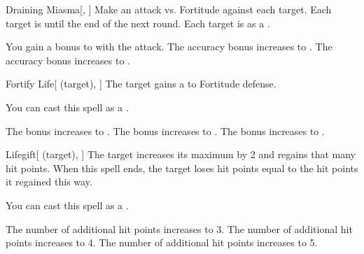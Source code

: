 \lowercase{\hypertarget{spell:Draining Miasma}{}}\label{spell:Draining Miasma}
\begin{freeability}[Rank 1]{\hypertarget{spell:Draining Miasma}{Draining Miasma}}[, ]
Make an attack vs. Fortitude against each target.
\hit Each target is  until the end of the next round.
\crit Each target is  as a .

\rankline
{} You gain a  bonus to  with the attack.
 The accuracy bonus increases to .
 The accuracy bonus increases to .
\end{freeability}
\vspace{0.25em}



\lowercase{\hypertarget{spell:Fortify Life}{}}\label{spell:Fortify Life}
\begin{attuneability}[Rank 1]{\hypertarget{spell:Fortify Life}{Fortify Life}}[ (target), ]
The target gains a   to Fortitude defense.

You can cast this spell as a .

\rankline
{} The bonus increases to .
 The bonus increases to .
 The bonus increases to .
\end{attuneability}
\vspace{0.25em}



\lowercase{\hypertarget{spell:Lifegift}{}}\label{spell:Lifegift}
\begin{attuneability}[Rank 1]{\hypertarget{spell:Lifegift}{Lifegift}}[ (target), ]
The target increases its maximum  by 2 and regains that many hit points.
When this spell ends, the target loses hit points equal to the hit points it regained this way.

You can cast this spell as a .

\rankline
{} The number of additional hit points increases to 3.
 The number of additional hit points increases to 4.
 The number of additional hit points increases to 5.
\end{attuneability}
\vspace{0.25em}



